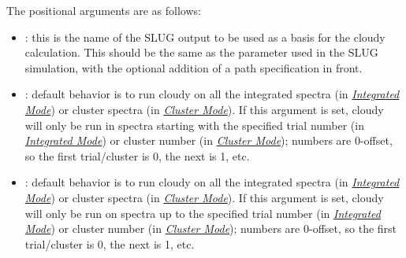 \documentclass[letterpaper,10pt,english]{sphinxmanual}
\begin{document}
The positional arguments are as follows:
\begin{itemize}
\item {} 
: this is the name of the SLUG output to be used
as a basis for the cloudy calculation. This should be the same as
the  parameter used in the SLUG simulation, with the
optional addition of a path specification in front.

\item {} 
: default behavior is to run cloudy on all the
integrated spectra (in {\hyperref[cloudy:sssec-cloudy-integrated-mode]{\emph{Integrated Mode}}}) or
cluster spectra (in {\hyperref[cloudy:sssec-cloudy-cluster-mode]{\emph{Cluster Mode}}}). If this
argument is set, cloudy will only be run in spectra starting with
the specified trial number (in {\hyperref[cloudy:sssec-cloudy-integrated-mode]{\emph{Integrated Mode}}})
or cluster number (in {\hyperref[cloudy:sssec-cloudy-cluster-mode]{\emph{Cluster Mode}}}); numbers are
0-offset, so the first trial/cluster is 0, the next is 1, etc.

\item {} 
: default behavior is to run cloudy on all the
integrated spectra (in {\hyperref[cloudy:sssec-cloudy-integrated-mode]{\emph{Integrated Mode}}}) or
cluster spectra (in {\hyperref[cloudy:sssec-cloudy-cluster-mode]{\emph{Cluster Mode}}}). If this
argument is set, cloudy will only be run on spectra up to the
specified trial number (in {\hyperref[cloudy:sssec-cloudy-integrated-mode]{\emph{Integrated Mode}}}) or
cluster number (in {\hyperref[cloudy:sssec-cloudy-cluster-mode]{\emph{Cluster Mode}}}); numbers are
0-offset, so the first trial/cluster is 0, the next is 1, etc.

\end{itemize}
\end{document}
